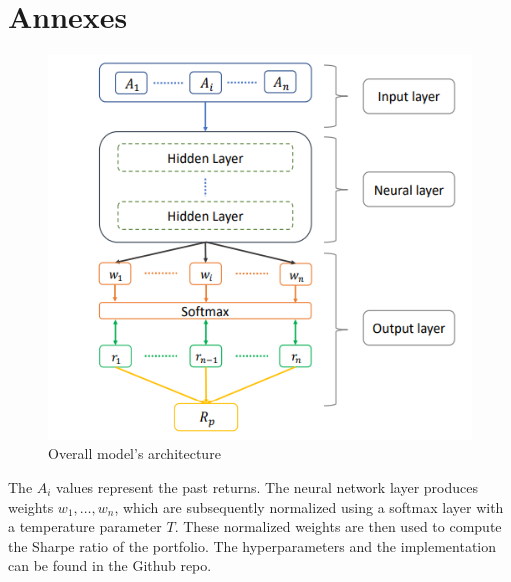 \documentclass[11pt]{article}
\begin{document}
\clearpage

\printbibliography

\clearpage

\section*{Annexes}

\begin{figure}
    \centering
    \includegraphics[width=0.5\linewidth]{images/architecture_model.PNG}
    \caption{Overall model's architecture}
    \label{fig:enter-label}
\end{figure}

The $A_i$ values represent the past returns. The neural network layer produces weights $w_1, \dots, w_n$, which are subsequently normalized using a softmax layer with a temperature parameter $T$. These normalized weights are then used to compute the Sharpe ratio of the portfolio. The hyperparameters and the implementation can be found in the Github repo.

\clearpage

\label{subsec:realdata_results}
\end{document}
